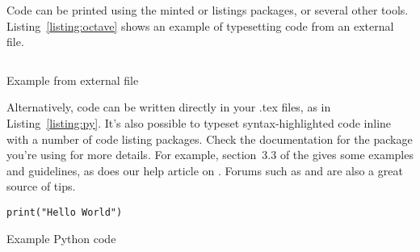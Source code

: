 Code can be printed using the minted or listings packages, or several other tools.
Listing~\ref{listing:octave} shows an example of typesetting code from an external file.

\begin{listing}
\inputminted{octave}{code/BitXorMatrix.m}
\caption{Example from external file}
\label{listing:octave}
\end{listing}

Alternatively, code can be written directly in your .tex files, as in Listing~\ref{listing:py}.
It's also possible to typeset syntax-highlighted code inline with a number of code listing packages.
Check the documentation for the package you're using for more details.
For example, section~3.3 of the  gives some examples and guidelines, as does our help article on . Forums such as  and  are also a great source of tips.

\begin{listing}
\begin{verbatim}
print("Hello World")
\end{verbatim}
\caption{Example Python code}
\label{listing:py}
\end{listing}
